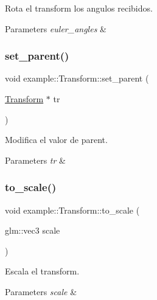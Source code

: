 Rota el transform los angulos recibidos. 


\begin{DoxyParams}{Parameters}
{\em euler\+\_\+angles} & \\
\hline
\end{DoxyParams}
\mbox{\label{classexample_1_1_transform_aff4f7e057327de2c74ff9f355f7c3b29}} 
\subsubsection{\texorpdfstring{set\_parent()}{set\_parent()}}
{\footnotesize\ttfamily void example\+::\+Transform\+::set\+\_\+parent (\begin{DoxyParamCaption}\item[{\mbox{\hyperlink{classexample_1_1_transform}{Transform}} $\ast$}]{tr }\end{DoxyParamCaption})\hspace{0.3cm}{\ttfamily [inline]}}



Modifica el valor de parent. 


\begin{DoxyParams}{Parameters}
{\em tr} & \\
\hline
\end{DoxyParams}
\mbox{\label{classexample_1_1_transform_a5e4e335ac8cf42199192dfc6bbdba0a3}} 
\subsubsection{\texorpdfstring{to\_scale()}{to\_scale()}}
{\footnotesize\ttfamily void example\+::\+Transform\+::to\+\_\+scale (\begin{DoxyParamCaption}\item[{glm\+::vec3}]{scale }\end{DoxyParamCaption})}



Escala el transform. 


\begin{DoxyParams}{Parameters}
{\em scale} & \\
\hline
\end{DoxyParams}
\mbox{\label{classexample_1_1_transform_a42ff7ae62e0b0c8b5a31f37a8b1de4da}} 
